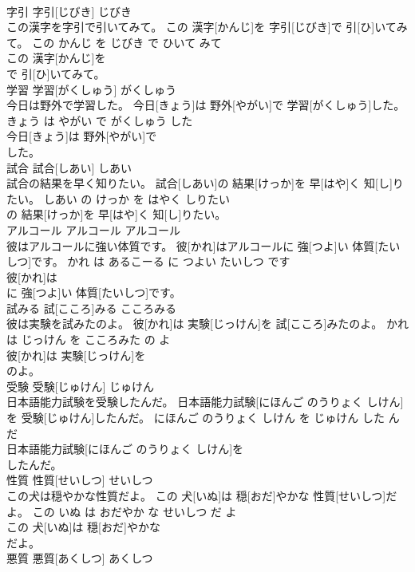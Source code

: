 \documentclass[8pt]{extreport}
\begin{document}
\begin{CJK}{UTF8}{min}
\\	字引	字引[じびき]	じびき	
\\	この漢字を字引で引いてみて。	この 漢字[かんじ]を 字引[じびき]で 引[ひ]いてみて。	この かんじ を じびき で ひいて みて	
\\	この 漢字[かんじ]を
\\	で 引[ひ]いてみて。			
\\	学習	学習[がくしゅう]	がくしゅう	
\\	今日は野外で学習した。	今日[きょう]は 野外[やがい]で 学習[がくしゅう]した。	きょう は やがい で がくしゅう した	
\\	今日[きょう]は 野外[やがい]で
\\	した。			
\\	試合	試合[しあい]	しあい	
\\	試合の結果を早く知りたい。	試合[しあい]の 結果[けっか]を 早[はや]く 知[し]りたい。	しあい の けっか を はやく しりたい	
\\	の 結果[けっか]を 早[はや]く 知[し]りたい。			
\\	アルコール	アルコール	アルコール	
\\	彼はアルコールに強い体質です。	彼[かれ]はアルコールに 強[つよ]い 体質[たいしつ]です。	かれ は あるこーる に つよい たいしつ です	
\\	彼[かれ]は
\\	に 強[つよ]い 体質[たいしつ]です。			
\\	試みる	試[こころ]みる	こころみる	
\\	彼は実験を試みたのよ。	彼[かれ]は 実験[じっけん]を 試[こころ]みたのよ。	かれ は じっけん を こころみた の よ	
\\	彼[かれ]は 実験[じっけん]を
\\	のよ。			
\\	受験	受験[じゅけん]	じゅけん	
\\	日本語能力試験を受験したんだ。	日本語能力試験[にほんご のうりょく しけん]を 受験[じゅけん]したんだ。	にほんご のうりょく しけん を じゅけん した ん だ	
\\	日本語能力試験[にほんご のうりょく しけん]を
\\	したんだ。			
\\	性質	性質[せいしつ]	せいしつ	
\\	この犬は穏やかな性質だよ。	この 犬[いぬ]は 穏[おだ]やかな 性質[せいしつ]だよ。	この いぬ は おだやか な せいしつ だ よ	
\\	この 犬[いぬ]は 穏[おだ]やかな
\\	だよ。			
\\	悪質	悪質[あくしつ]	あくしつ	

\end{CJK}
\end{document}
